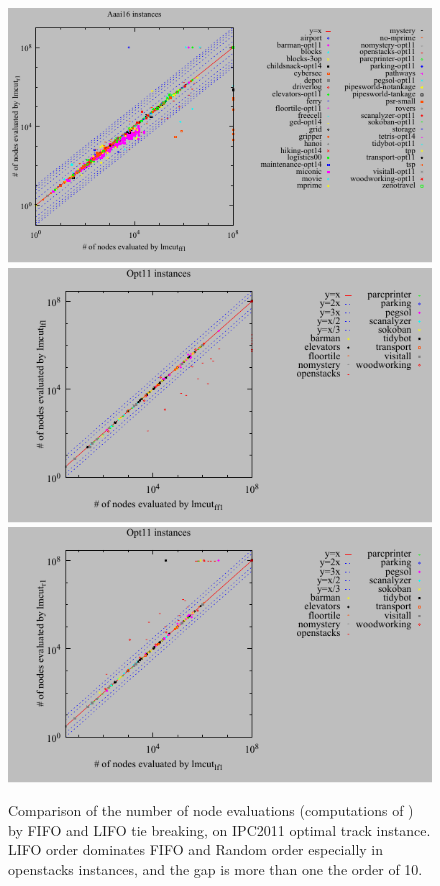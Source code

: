 \begin{figure}[htbp]
 \centering
 \includegraphics{tables/aaai16-evaluated-lmcut_ff-lmcut_r.pdf}
 \includegraphics{tables/opt11-evaluated-lmcut_ff-lmcut_lf.pdf}
 \includegraphics{tables/opt11-evaluated-lmcut_lf-lmcut_r.pdf}
\caption{Comparison of the number of node evaluations (computations of \lmcut) by FIFO and LIFO tie breaking, on IPC2011 optimal track instance. LIFO order dominates FIFO and Random order especially in openstacks instances, and the gap is more than one the order of 10.}
 \label{single-eval}
\end{figure}

